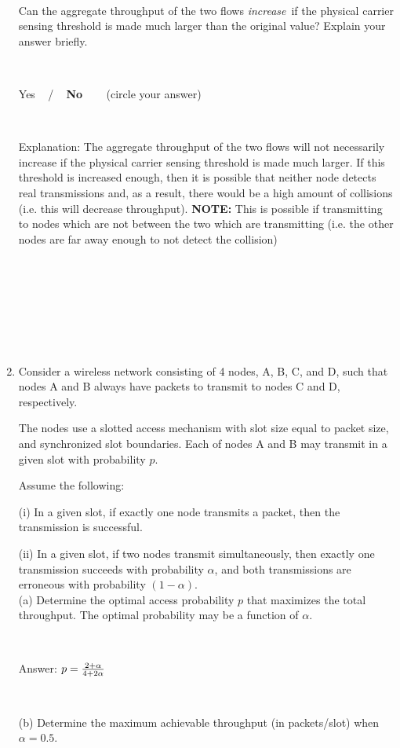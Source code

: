 \documentclass[letterpaper, 12pt]{article}
\begin{document}
\begin{enumerate}
~

Can the aggregate throughput of the two flows
{\em increase}\, if the physical carrier sensing threshold is made much larger than the 
original value?
Explain your answer briefly.

~

Yes ~ / ~ \textbf{No} ~~~ (circle your answer)


~

Explanation: The aggregate throughput of the two flows will not necessarily increase if the physical carrier sensing threshold is made much larger. If this threshold is increased enough, then it is possible that neither node detects real transmissions and, as a result, there would be a high amount of collisions (i.e. this will decrease throughput). \textbf{NOTE:} This is possible if transmitting to nodes which are not between the two which are transmitting (i.e. the other nodes are far away enough to not detect the collision)


~

~

~

~


\item Consider a wireless network consisting of 4 nodes,
A, B, C, and D, such that nodes A and B always have packets to transmit
to nodes C and D, respectively.

The nodes use a slotted access mechanism with slot size
equal to packet size, and synchronized slot boundaries.
Each of nodes A and B may transmit in a given slot with
probability $p$.

Assume the following:

(i) In a given slot, if exactly one node transmits a packet, then
	the transmission is successful.

(ii) In a given slot, if two nodes transmit simultaneously, then
	exactly one transmission succeeds with probability
	$\alpha$, and both transmissions are erroneous with
	probability $(1-\alpha)$. \\

(a) Determine the optimal access probability $p$ that maximizes the total
throughput. The optimal probability may be a function of $\alpha$.

~


Answer: $p = {{2 + \alpha} \over {4 + 2\alpha}}$


~

(b) Determine the maximum achievable throughput (in packets/slot) 
	when $\alpha=0.5$.


\end{enumerate}
\end{document}
